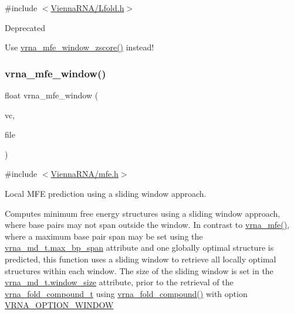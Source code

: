 {\ttfamily \#include $<$\hyperlink{Lfold_8h}{Vienna\+R\+N\+A/\+Lfold.\+h}$>$}

\begin{DoxyRefDesc}{Deprecated}
\item[\hyperlink{deprecated__deprecated000087}{Deprecated}]Use \hyperlink{group__local__mfe__fold_gaa4f67ae94efd08d800c17f9b53423fd6}{vrna\+\_\+mfe\+\_\+window\+\_\+zscore()} instead! \end{DoxyRefDesc}
\mbox{\label{group__local__mfe__fold_ga689df235a1915a1ad56e377383c044ce}} 
\subsubsection{\texorpdfstring{vrna\+\_\+mfe\+\_\+window()}{vrna\_mfe\_window()}}
{\footnotesize\ttfamily float vrna\+\_\+mfe\+\_\+window (\begin{DoxyParamCaption}\item[{\hyperlink{group__fold__compound_ga1b0cef17fd40466cef5968eaeeff6166}{vrna\+\_\+fold\+\_\+compound\+\_\+t} $\ast$}]{vc,  }\item[{F\+I\+LE $\ast$}]{file }\end{DoxyParamCaption})}



{\ttfamily \#include $<$\hyperlink{mfe_8h}{Vienna\+R\+N\+A/mfe.\+h}$>$}



Local M\+FE prediction using a sliding window approach. 

Computes minimum free energy structures using a sliding window approach, where base pairs may not span outside the window. In contrast to \hyperlink{group__mfe__fold_gabd3b147371ccf25c577f88bbbaf159fd}{vrna\+\_\+mfe()}, where a maximum base pair span may be set using the \hyperlink{group__model__details_a659e5fcc6e8c9f1a68e7de6548eef3b0}{vrna\+\_\+md\+\_\+t.\+max\+\_\+bp\+\_\+span} attribute and one globally optimal structure is predicted, this function uses a sliding window to retrieve all locally optimal structures within each window. The size of the sliding window is set in the \hyperlink{group__model__details_abea42f9229f8d8d6bcbedef316315bfc}{vrna\+\_\+md\+\_\+t.\+window\+\_\+size} attribute, prior to the retrieval of the \hyperlink{group__fold__compound_ga1b0cef17fd40466cef5968eaeeff6166}{vrna\+\_\+fold\+\_\+compound\+\_\+t} using \hyperlink{group__fold__compound_ga6601d994ba32b11511b36f68b08403be}{vrna\+\_\+fold\+\_\+compound()} with option \hyperlink{group__fold__compound_ga2b2a8009ccdccc3eb1571556261aee8e}{V\+R\+N\+A\+\_\+\+O\+P\+T\+I\+O\+N\+\_\+\+W\+I\+N\+D\+OW}

